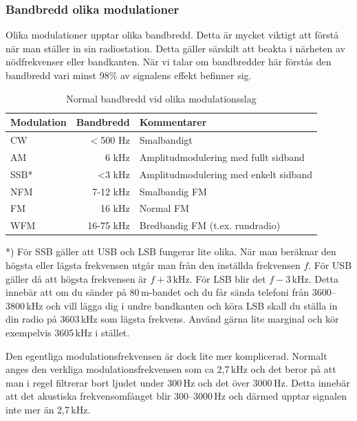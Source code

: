 \subsubsection{Bandbredd olika modulationer}

Olika modulationer upptar olika bandbredd. Detta är mycket viktigt att förstå när man ställer in sin radiostation. Detta gäller särskilt att beakta i närheten av nödfrekvenser eller bandkanten. När vi talar om bandbredder här förstås den bandbredd vari minst 98\% av signalens effekt befinner sig.

\begin{table}[H]
\centering
\begin{tabular}{lrl}
	\textbf{Modulation} & \textbf{Bandbredd} & \textbf{Kommentarer}                  \\ \hline
	CW                  &          $<$500 Hz & Smalbandigt                           \\
	AM                  &              6 kHz & Amplitudmodulering med fullt sidband  \\
	SSB*                &              <3 kHz & Amplitudmodulering med enkelt sidband \\
	NFM                 &           7-12 kHz & Smalbandig FM                         \\
	FM                  &             16 kHz & Normal FM                             \\
	WFM                 &          16-75 kHz & Bredbandig FM (t.ex. rundradio)
\end{tabular}
\caption{Normal bandbredd vid olika modulationsslag}
\end{table}

*) För SSB gäller att USB och LSB fungerar lite olika. När man beräknar den högsta eller lägsta frekvensen utgår man från den inställda frekvensen $f$. För USB gäller då att högsta frekvensen är $f+3$\,kHz. För LSB blir det $f-3$\,kHz. Detta innebär att om du sänder på 80\,m-bandet och du får sända telefoni från 3600--3800\,kHz och vill lägga dig i undre bandkanten och köra LSB skall du ställa in din radio på 3603\,kHz som lägsta frekvens. Använd gärna lite marginal och kör exempelvis 3605\,kHz i stället.

Den egentliga modulationsfrekvensen är dock lite mer komplicerad. Normalt anges den verkliga modulationsfrekvensen som ca 2,7\,kHz och det beror på att man i regel filtrerar bort ljudet under 300\,Hz och det över 3000\,Hz. Detta innebär att det akustiska frekvensomfånget blir 300--3000\,Hz och därmed upptar signalen inte mer än 2,7\,kHz.

